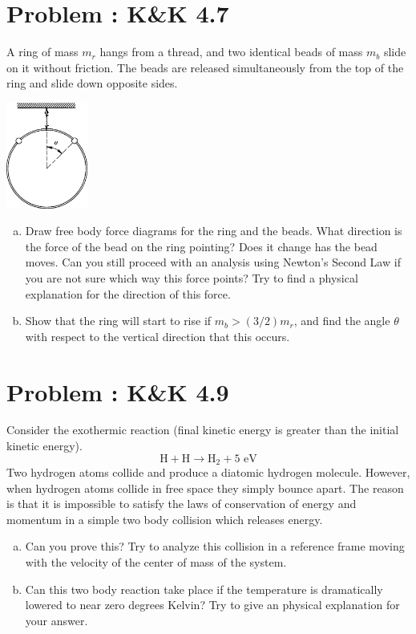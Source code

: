 \documentclass[problems]{esg8012pset}
\begin{document}
\section{Problem \thesection: K\&K 4.7}
  A ring of mass $m_r$ hangs from a thread, and two identical beads of mass $m_b$ slide on it without friction. The beads are released simultaneously from the top of the ring and slide down opposite sides.
  \begin{center}\includegraphics[width=0.2\textwidth]{ps06_2}\end{center}
  \begin{enumerate}[(a)]
    \item Draw free body force diagrams for the ring and the beads. What direction is the force of the bead on the ring pointing? Does it change has the bead moves. Can you still proceed with an analysis using Newton's Second Law if you are not sure which way this force points? Try to find a physical explanation for the direction of this force.
    \item Show that the ring will start to rise if $m_b > (3/2)m_r$, and find the angle $\theta$ with respect to the vertical direction that this occurs.
  \end{enumerate}
\section{Problem \thesection: K\&K 4.9}
  Consider the exothermic reaction (final kinetic energy is greater than the initial kinetic energy).
  $$\text{H} + \text{H} \to \text{H}_2 + 5\text{ eV}$$
  Two hydrogen atoms collide and produce a diatomic hydrogen molecule. However, when hydrogen atoms collide in free space they simply bounce apart. The reason is that it is impossible to satisfy the laws of conservation of energy and momentum in a simple two body collision which releases energy.
  \begin{enumerate}[(a)]
  \item Can you prove this? Try to analyze this collision in a reference frame moving with the velocity of the center of mass of the system.
    \item Can this two body reaction take place if the temperature is dramatically lowered to near zero degrees Kelvin? Try to give an physical explanation for your answer.
  \end{enumerate}
\end{document}
